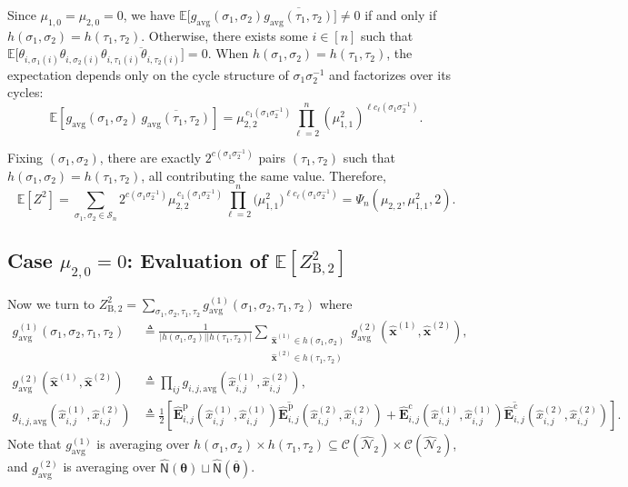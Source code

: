 \documentclass[conference]{IEEEtran}
\theoremstyle{plain}
\theoremstyle{definition}
\newcommand{\B}{\mathrm{B}}
\newcommand{\E}{\mathbb {E}}
\newcommand{\sfn}{\mathsf{N}}
\newcommand{\hatx}[1]{\widehat{x}_{ #1 }}
\newcommand{\hatbfx}[1][]{\widehat{\mathbf{x}}^{ #1 }}
\newcommand{\btheta}{\boldsymbol{\theta}}
\newcommand{\defeq}{\triangleq}
\newcommand{\validc}{\mathcal {C}(\widehat{\mathcal N}_2)}
\begin{document}
 Since $\mu_{1,0}=\mu_{2,0}=0$, we have
 $\E\Big[g_\mathrm{avg}(\sigma_1,\sigma_2)\overline{g_\mathrm{avg}(\tau_1,\tau_2)}\Big]\neq
 0$ if and only if $h(\sigma_1,\sigma_2)=h(\tau_1,\tau_2)$. Otherwise, there
 exists some $i\in[n]$ such that
 $\E\Big[\theta_{i,\sigma_1(i)}\theta_{i,\sigma_2(i)}\overline{\theta_{i,\tau_1(i)}\theta_{i,\tau_2(i)}}\Big]=0$.
 When $h(\sigma_1,\sigma_2)=h(\tau_1,\tau_2)$, the expectation depends only on
 the cycle structure of $\sigma_1\sigma_2^{-1}$ and factorizes over its cycles:
 \[
  \E\left[
   g_{\mathrm{avg}}(\sigma_1,\sigma_2)\,
   \overline{g_{\mathrm{avg}}(\tau_1,\tau_2)}
   \right]
  =
  \mu_{2,2}^{\,c_1(\sigma_1\sigma_2^{-1})}
  \prod_{\ell=2}^n (\mu_{1,1}^2)^{\ell c_\ell(\sigma_1\sigma_2^{-1})}.
 \]

 Fixing $(\sigma_1,\sigma_2)$, there are exactly $2^{c(\sigma_1\sigma_2^{-1})}$
 pairs $(\tau_1,\tau_2)$ such that $h(\sigma_1,\sigma_2)=h(\tau_1,\tau_2)$, all
 contributing the same value. Therefore,
 \[
  \E[Z^2]
  =  \sum_{\sigma_1,\sigma_2\in \mathcal{S}_n}
  2^{c(\sigma_1\sigma_2^{-1})}
  \mu_{2,2}^{\,c_1(\sigma_1\sigma_2^{-1})}
  \prod_{\ell=2}^n
  \bigl(\mu_{1,1}^2\bigr)^{\ell c_\ell(\sigma_1\sigma_2^{-1})}
  =\Psi_n(\mu_{2,2},\mu_{1,1}^2,2).
 \]

 \subsection{Case $\mu_{2,0}=0$: Evaluation of $\E [Z_{\B,2}^2]$}
 Now we turn to $Z^2_{\B,2}=\sum_{\sigma_1,\sigma_2,\tau_1,\tau_2}
  g_\mathrm{avg}^{(1)}(\sigma_1,\sigma_2,\tau_1,\tau_2)$ where
 \begin{align*}
  g_\mathrm{avg}^{(1)}(\sigma_1,\sigma_2,\tau_1,\tau_2)   & \defeq
  \frac{1}{|h(\sigma_1,\sigma_2)||h(\tau_1,\tau_2)|}\sum_{\substack{\hatbfx[(1)]\in h(\sigma_1,\sigma_2)                               \\\hatbfx[(2)]\in h(\tau_1,\tau_2)}}
  g_{\mathrm {avg}}^{(2)}(\hatbfx[(1)],\hatbfx[(2)]),                                                                                  \\
  g_{\mathrm {avg}}^{(2)}(\hatbfx[(1)],\hatbfx[(2)])      & \defeq \prod_{ij} g_{i,j,\mathrm{avg}}(\hatx{i,j}^{(1)},\hatx{i,j}^{(2)}), \\
  g_{i,j,\mathrm{avg}}(\hatx{i,j}^{(1)},\hatx{i,j}^{(2)}) & \defeq
  \frac{1}{2}\left[\widehat{\mathbf E}_{i,j}^\mathrm{p} (\hatx{i,j}^{(1)},\hatx{i,j}^{(1)})
   \overline{\widehat{\mathbf E}_{i,j}^\mathrm{p}} (\hatx{i,j}^{(2)},\hatx{i,j}^{(2)})
   +\widehat{\mathbf E}_{i,j}^\mathrm{c} (\hatx{i,j}^{(1)},\hatx{i,j}^{(1)})
   \overline{\widehat{\mathbf E}_{i,j}^\mathrm{c}} (\hatx{i,j}^{(2)},\hatx{i,j}^{(2)})\right].
 \end{align*}
 Note that $g_{\mathrm{avg}}^{(1)}$ is averaging over $h(\sigma_1,\sigma_2)\times h(\tau_1,\tau_2)\subseteq \validc \times \validc$,
 and $g_{\mathrm {avg}}^{(2)}$ is averaging over $\widehat{\sfn}(\btheta)\sqcup\widehat{\sfn}(\overline{\btheta})$.
\end{document}
